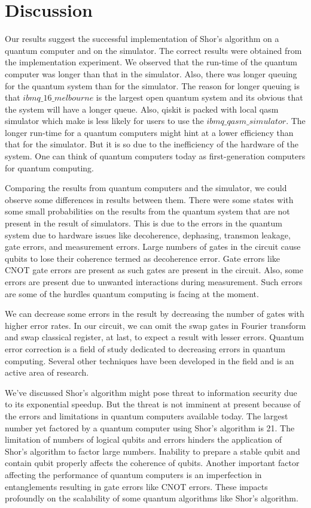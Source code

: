 \section{Discussion}
Our results suggest the successful implementation of Shor's algorithm on a quantum computer and on the simulator. The correct results were obtained from the implementation experiment. We observed that the run-time of the quantum computer was longer than that in the simulator. Also, there was longer queuing for the quantum system than for the simulator. The reason for longer queuing is that $ibmq\_16\_melbourne$ is the largest open quantum system and its obvious that the system will have a longer queue. Also, qiskit is packed with local qasm simulator which make is less likely for users to use the $ibmq\_qasm\_simulator$. The longer run-time for a quantum computers might hint at a lower efficiency than that for the simulator. But it is so due to the inefficiency of the hardware of the system. One can think of quantum computers today as first-generation computers for quantum computing.

Comparing the results from quantum computers and the simulator, we could observe some differences in results between them. There were some states with some small probabilities on the results from the quantum system that are not present in the result of simulators. This is due to the errors in the quantum system due to hardware issues like decoherence, dephasing, transmon leakage, gate errors, and measurement errors. Large numbers of gates in the circuit cause qubits to lose their coherence termed as decoherence error.\cite{Nielsen2002} Gate errors like CNOT gate errors are present as such gates are present in the circuit. Also, some errors are present due to unwanted interactions during measurement. Such errors are some of the hurdles quantum computing is facing at the moment.

We can decrease some errors in the result by decreasing the number of gates with higher error rates. In our circuit, we can omit the swap gates in Fourier transform and swap classical register, at last, to expect a result with lesser errors. Quantum error correction is a field of study dedicated to decreasing errors in quantum computing. Several other techniques have been developed in the field and is an active area of research. 


We've discussed Shor's algorithm might pose threat to information security due to its exponential speedup. But the threat is not imminent at present because of the errors and limitations in quantum computers available today. The largest number yet factored by a quantum computer using Shor's algorithm is 21\cite{martin2012experimental}. The limitation of numbers of logical qubits and errors hinders the application of Shor's algorithm to factor large numbers. Inability to prepare a stable qubit and contain qubit properly affects the coherence of qubits. Another important factor affecting the performance of quantum computers is an imperfection in entanglements resulting in gate errors like CNOT errors. These impacts profoundly on the scalability of some quantum algorithms like Shor's algorithm. 

